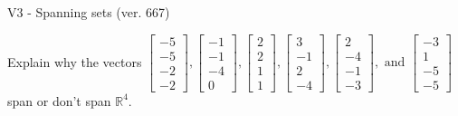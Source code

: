 \begin{exercise}
  \begin{exerciseTitle}V3 - Spanning sets (ver. 667)\end{exerciseTitle}
  \begin{exerciseStatement}
    Explain why the vectors \(\left[\begin{array}{r}
-5 \\
-5 \\
-2 \\
-2
\end{array}\right] , \left[\begin{array}{r}
-1 \\
-1 \\
-4 \\
0
\end{array}\right] , \left[\begin{array}{r}
2 \\
2 \\
1 \\
1
\end{array}\right] , \left[\begin{array}{r}
3 \\
-1 \\
2 \\
-4
\end{array}\right] , \left[\begin{array}{r}
2 \\
-4 \\
-1 \\
-3
\end{array}\right] , \text{ and } \left[\begin{array}{r}
-3 \\
1 \\
-5 \\
-5
\end{array}\right]\) span or don't span \(\mathbb{R}^4\). 
	



\end{exerciseStatement}
\end{exercise}
